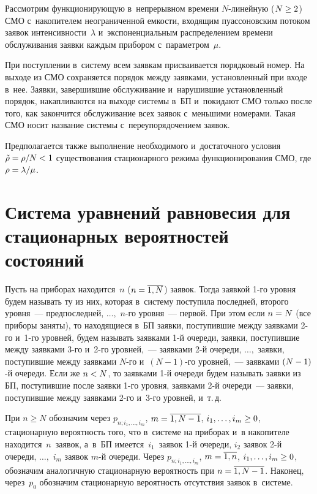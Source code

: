 \begin{multicols}{2}
Рассмотрим функционирующую в~непрерывном времени
$N$-ли\-ней\-ную ($N\hm\ge 2$) СМО с~на\-ко\-пителем
неограниченной емкости, входящим пу\-ассоновским
потоком заявок интенсивности~$\lambda$\linebreak
 и~экспоненциальным распределением времени
обслуживания заявки каждым прибором с~пара\-мет\-ром~$\mu$.


При поступлении в~систему всем заявкам  присваивается
порядковый номер.
На выходе из СМО сохраняется порядок между заявками,
установленный при входе в~нее.
Заявки, завершившие обслуживание и~нарушившие
установленный порядок, накапливаются на выходе
сис\-те\-мы в~БП и~покидают СМО только
после того, как закончится обслуживание всех заявок 
с~меньшими номерами.
Такая СМО носит название системы с~переупорядочением заявок.

Предполагается также выполнение необходимого и~достаточного условия 
${\tilde{\rho}\hm=\rho/N\hm<1}$ существования
стационарного режима функционирования СМО,
где ${\rho\hm=\lambda/\mu}$.

\section{Система уравнений равновесия для стационарных вероятностей состояний}

Пусть на приборах находится~$n$ ($n\hm=\overline{1,N}$) заявок. Тогда заявкой
1-го уровня будем называть ту из них, которая в~систему поступила
последней, второго уровня~--- предпоследней, $\ldots,$ $n$-го уровня~--- 
первой. При этом если $n\hm=N$ (все приборы заняты), то находящиеся
в~БП заявки, поступившие между заявками 2-го и~1-го уровней,
будем называть заявками 1-й очереди, заявки, поступившие между
заявками 3-го и~2-го уровней,~--- заявками 2-й очереди,
$\ldots,$ заявки, поступившие между заявками $N$-го и~$(N-1)$-го
уровней,~--- заявками $(N\hm-1)$-й очереди. Если же $n\hm<N$, то  заявками
1-й очереди будем называть заявки из БП, поступившие после заявки
1-го уровня, заявками 2-й очереди~--- заявки, поступившие
между заявками 2-го и~3-го уровней, и~т.\,д.

При $n\ge N$ обозначим через
$p_{n;i_1,\ldots,i_m}$, $m\hm=\overline{1,N-1}$, $i_1,\ldots,i_m\hm\ge 0$,
стационарную вероятность того, что в~системе на
приборах и~в накопителе находится~$n$~заявок, а~в~БП
имеется~$i_1$~заявок 1-й очереди, $i_2$ заявок
2-й очереди, $\ldots,$ $i_{m}$ заявок $m$-й очереди.
Через $p_{n;i_1,\ldots,i_m}$, $m\hm=\overline{1,n}$,
$i_1,\ldots,i_m\hm\ge 0$, обозначим аналогичную
стационарную вероятность при $n\hm=\overline{1,N-1}$.
Наконец, через~$p_0$ обозначим стационарную вероятность отсутствия заявок в~системе.


\end{multicols}

